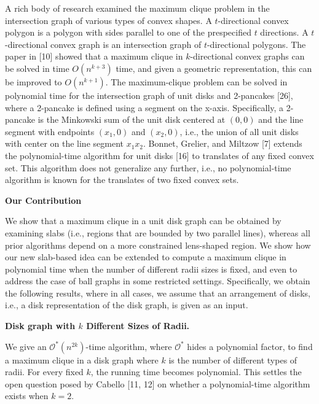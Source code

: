\par
\par
A rich body of research examined the maximum clique problem in the intersection graph of various types of convex shapes. A $t$-directional convex polygon is a polygon with sides parallel to one of the prespecified $t$ directions. A $t$-directional convex graph is an intersection graph of $t$-directional polygons. The paper in [10] showed that a maximum clique in $k$-directional convex graphs can be solved in time $O(n^{k+3})$ time, and given a geometric representation, this can be improved to $O(n^{k+1})$. The maximum-clique problem can be solved in polynomial time for the intersection graph of unit disks and 2-pancakes [26], where a 2-pancake is defined using a segment on the x-axis. Specifically, a 2-pancake is the Minkowski sum of the unit disk centered at $(0,0)$ and the line segment with endpoints $(x_{1},0)$ and $(x_{2},0)$, i.e., the union of all unit disks with center on the line segment $x_{1}x_{2}$. Bonnet, Grelier, and Miltzow [7] extends the polynomial-time algorithm for unit disks [16] to translates of any fixed convex set. This algorithm does not generalize any further, i.e., no polynomial-time algorithm is known for the translates of two fixed convex sets.
\par
\par
\par\medskip\noindent\textbf{Our Contribution}\par
We show that a maximum clique in a unit disk graph can be obtained by examining slabs (i.e., regions that are bounded by two parallel lines), whereas all prior algorithms depend on a more constrained lens-shaped region. We show how our new slab-based idea can be extended to compute a maximum clique in polynomial time when the number of different radii sizes is fixed, and even to address the case of ball graphs in some restricted settings. Specifically, we obtain the following results, where in all cases, we assume that an arrangement of disks, i.e., a disk representation of the disk graph, is given as an input.
\par
\par
\par\medskip\noindent\textbf{Disk graph with $k$ Different Sizes of Radii.}\par
We give an $\mathcal{O}^{*}(n^{2k})$-time algorithm, where $\mathcal{O}^{*}$ hides a polynomial factor, to find a maximum clique in a disk graph where $k$ is the number of different types of radii. For every fixed $k$, the running time becomes polynomial. This settles the open question posed by Cabello [11, 12] on whether a polynomial-time algorithm exists when $k=2$.
